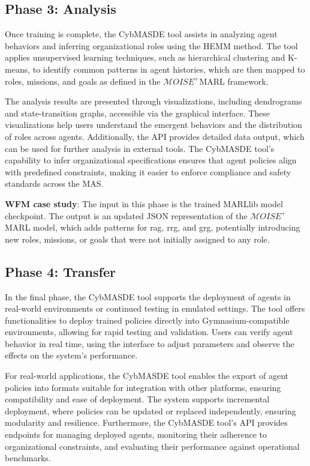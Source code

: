 \documentclass[conference]{IEEEtran}
\begin{document}
\subsection{Phase 3: Analysis}

Once training is complete, the CybMASDE tool assists in analyzing agent behaviors and inferring organizational roles using the HEMM method. The tool applies unsupervised learning techniques, such as hierarchical clustering and K-means, to identify common patterns in agent histories, which are then mapped to roles, missions, and goals as defined in the $\mathcal{M}OISE^+$MARL framework.

The analysis results are presented through visualizations, including dendrograms and state-transition graphs, accessible via the graphical interface. These visualizations help users understand the emergent behaviors and the distribution of roles across agents. Additionally, the API provides detailed data output, which can be used for further analysis in external tools. The CybMASDE tool's capability to infer organizational specifications ensures that agent policies align with predefined constraints, making it easier to enforce compliance and safety standards across the MAS.

\textbf{WFM case study}: The input in this phase is the trained MARLlib model checkpoint. The output is an updated JSON representation of the $\mathcal{M}OISE^+$MARL model, which adds patterns for rag, rrg, and grg, potentially introducing new roles, missions, or goals that were not initially assigned to any role.

\subsection{Phase 4: Transfer}

In the final phase, the CybMASDE tool supports the deployment of agents in real-world environments or continued testing in emulated settings. The tool offers functionalities to deploy trained policies directly into Gymnasium-compatible environments, allowing for rapid testing and validation. Users can verify agent behavior in real time, using the interface to adjust parameters and observe the effects on the system's performance.

For real-world applications, the CybMASDE tool enables the export of agent policies into formats suitable for integration with other platforms, ensuring compatibility and ease of deployment. The system supports incremental deployment, where policies can be updated or replaced independently, ensuring modularity and resilience. Furthermore, the CybMASDE tool's API provides endpoints for managing deployed agents, monitoring their adherence to organizational constraints, and evaluating their performance against operational benchmarks.
\end{document}
